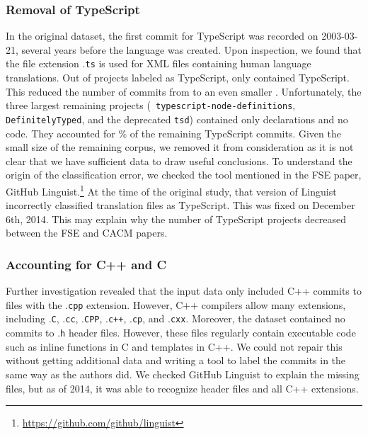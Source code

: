 \documentclass[acmsmall]{acmart}
\newcommand{\pct}[1]{#1\!\!\%\xspace}
\renewcommand{\c}{{\sf  C}\xspace}
\newcommand{\cpp}{{\sf  C++}\xspace}
\newcommand{\ts}{{\sf  TypeScript}\xspace}
\newcommand{\gh}{{GitHub}\xspace}
\newcommand{\code}[1]{{\tt\small #1}\xspace}
\begin{document}
\subsubsection{Removal of TypeScript}

In the original dataset, the first commit for \ts was recorded on
2003-03-21, several years before the language was created. Upon inspection,
we found that the file extension .\code{ts} is used for XML files containing
human language translations. Out of \initialNumTSProjects projects labeled
as \ts, only \realTSProjNum contained \ts. This reduced the number of
commits from \initialNumTSCommits to an even smaller \realTSCommitsNum.
Unfortunately, the three largest remaining projects (\code{\small
  typescript-node-definitions}, \code{\small Definitely\-Typed}, and the
deprecated \code{\small tsd}) contained only declarations and no code.  They
accounted for \pct{\ratioOfTypeDefTSCommits} of the remaining \ts commits.
Given the small size of the remaining corpus, we removed it from
consideration as it is not clear that we have sufficient data to draw useful
conclusions.  
To understand the origin of the classification error, we checked the tool
mentioned in the FSE paper, \gh
Linguist.\footnote{\url{https://github.com/github/linguist}} At the time of
the original study, that version of Linguist incorrectly classified
translation files as \ts. This was fixed on December 6th, 2014. This may
explain why the number of \ts projects decreased between the FSE and CACM
papers.

\subsubsection{Accounting for C++ and C}

Further investigation revealed that the input data only included \cpp
commits to files with the .\code{cpp} extension. However, \cpp compilers allow
many extensions, including .\code{C}, .\code{cc}, .\code{CPP}, .\code{c++},
.\code{cp}, and .\code{cxx}.  Moreover, the dataset contained no commits to
.\code{h} header files.  However, these files regularly contain executable
code such as inline functions in \c and templates in \cpp.  We could not
repair this without getting additional data and writing a tool to label the
commits in the same way as the authors did.  We checked \gh Linguist to
explain the missing files, but as of 2014, it was able to recognize header
files and all \cpp extensions.  
\end{document}
